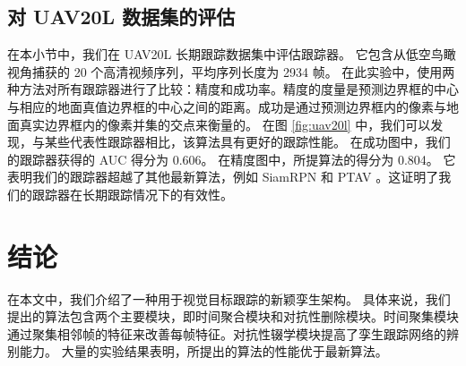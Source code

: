 \subsection{对 UAV20L 数据集的评估}
在本小节中，我们在 UAV20L \cite{mueller2016benchmark} 长期跟踪数据集中评估跟踪器。
它包含从低空鸟瞰视角捕获的 20 个高清视频序列，平均序列长度为 2934 帧。
在此实验中，使用两种方法对所有跟踪器进行了比较：精度和成功率。精度的度量是预测边界框的中心与相应的地面真值边界框的中心之间的距离。成功是通过预测边界框内的像素与地面真实边界框内的像素并集的交点来衡量的。
在图 \ref{fig:uav20l} 中，我们可以发现，与某些代表性跟踪器相比，该算法具有更好的跟踪性能。
在成功图中，我们的跟踪器获得的 AUC 得分为 0.606。
在精度图中，所提算法的得分为 0.804。
它表明我们的跟踪器超越了其他最新算法，例如 SiamRPN \cite{SiamRPN} 和 PTAV \cite{fan2018parallel}。这证明了我们的跟踪器在长期跟踪情况下的有效性。

\section{结论}
在本文中，我们介绍了一种用于视觉目标跟踪的新颖孪生架构。
具体来说，我们提出的算法包含两个主要模块，即时间聚合模块和对抗性删除模块。时间聚集模块通过聚集相邻帧的特征来改善每帧特征。对抗性辍学模块提高了孪生跟踪网络的辨别能力。
大量的实验结果表明，所提出的算法的性能优于最新算法。